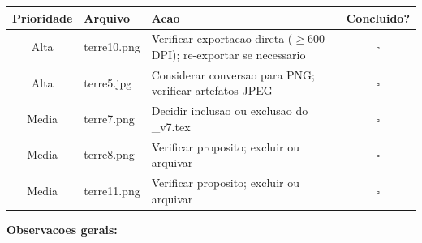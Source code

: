 \documentclass[a4paper,12pt]{article}
\begin{document}
\begin{table}[h!]
\centering
\renewcommand{\arraystretch}{1.5}
\begin{tabular}{clp{8cm}c}
\toprule
\textbf{Prioridade} & \textbf{Arquivo} & \textbf{Acao} & \textbf{Concluido?} \\
\midrule
\rowcolor{atencao} Alta  & terre10.png  & Verificar exportacao direta ($\geq$600 DPI); re-exportar se necessario & $\square$ \\
\rowcolor{atencao} Alta  & terre5.jpg   & Considerar conversao para PNG; verificar artefatos JPEG & $\square$ \\
\rowcolor{unused}  Media & terre7.png   & Decidir inclusao ou exclusao do \_v7.tex & $\square$ \\
\rowcolor{unused}  Media & terre8.png   & Verificar proposito; excluir ou arquivar & $\square$ \\
\rowcolor{unused}  Media & terre11.png  & Verificar proposito; excluir ou arquivar & $\square$ \\
\bottomrule
\end{tabular}
\end{table}

\bigskip
\noindent\textbf{Observacoes gerais:}
\begin{mdframed}[linecolor=gray!30,backgroundcolor=white,innertopmargin=8pt,innerbottommargin=8pt]
  \vspace{5cm}
\end{mdframed}
\end{document}
